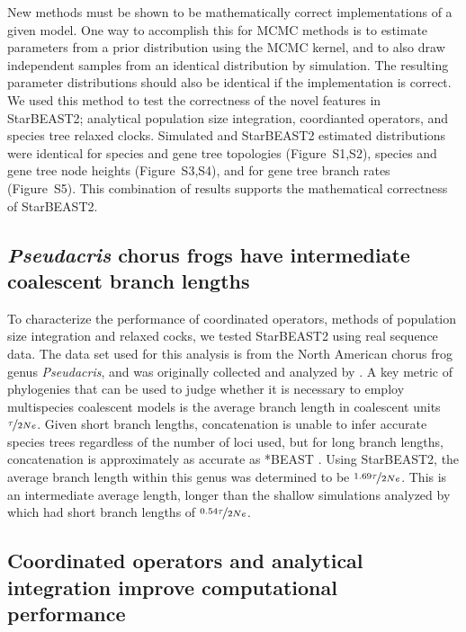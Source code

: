 \documentclass[12pt]{article}
\begin{document}
New methods must be shown to be mathematically correct implementations of a
given model. One way to accomplish this for MCMC methods is to estimate
parameters from a prior distribution using the MCMC kernel, and to also draw
independent samples from an identical distribution by simulation. The
resulting parameter distributions should also be identical if the implementation is
correct. We used this method to test the correctness of the novel features in
StarBEAST2; analytical population size integration, coordianted operators, and
species tree relaxed clocks. Simulated and StarBEAST2 estimated distributions
were identical for species and gene tree topologies (Figure~S1,S2), species and
gene tree node heights (Figure~S3,S4), and for gene tree branch rates (Figure~S5).
This combination of results supports the mathematical correctness of StarBEAST2.

\subsection*{\textit{Pseudacris} chorus frogs have intermediate coalescent branch lengths}

To characterize the performance of coordinated operators, methods of population size
integration and relaxed cocks, we tested StarBEAST2 using real sequence data.
The data set used for this analysis is from the North American chorus frog genus
\textit{Pseudacris}, and was originally collected and analyzed by
\cite{Barrow201478}. A key metric of phylogenies that can be used to judge
whether it is necessary to employ multispecies coalescent models is the average
branch length in coalescent units $\nicefrac{\tau}{2Ne}$. Given short branch
lengths, concatenation is unable to infer accurate species trees regardless of
the number of loci used, but for long branch lengths, concatenation is
approximately as accurate as *BEAST \citep{Ogilvie01052016}. Using StarBEAST2,
the average branch length within this genus was determined to be
$\nicefrac{1.69\tau}{2Ne}$. This is an intermediate average length, longer than
the shallow simulations analyzed by \cite{Ogilvie01052016} which had short
branch lengths of $\nicefrac{0.54\tau}{2Ne}$.

\subsection*{Coordinated operators and analytical integration improve computational performance}
\end{document}
